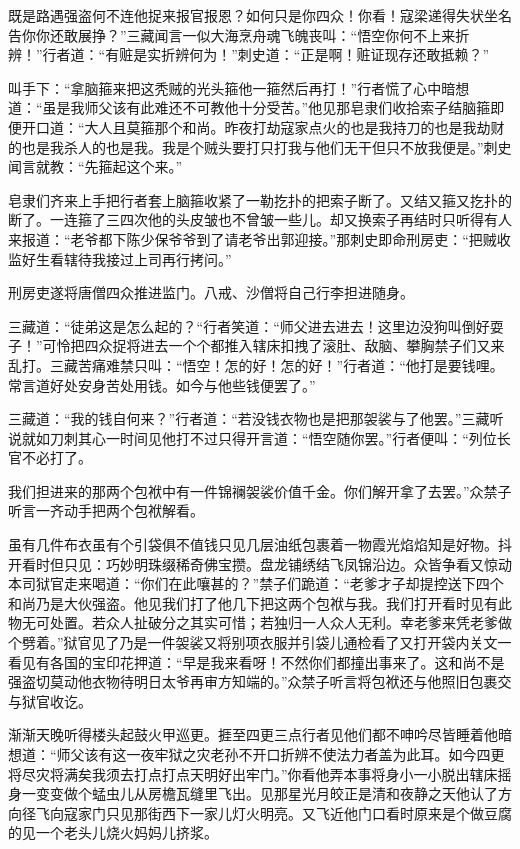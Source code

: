 \documentclass[12pt,UTF8]{ctexbook}
\begin{document}
{	既是路遇强盗何不连他捉来报官报恩？如何只是你四众！你看！寇梁递得失状坐名告你你还敢展挣？”三藏闻言一似大海烹舟魂飞魄丧叫：“悟空你何不上来折辨！”行者道：“有赃是实折辨何为！”刺史道：“正是啊！赃证现存还敢抵赖？”
	
	叫手下：“拿脑箍来把这秃贼的光头箍他一箍然后再打！”行者慌了心中暗想道：“虽是我师父该有此难还不可教他十分受苦。”他见那皂隶们收拾索子结脑箍即便开口道：“大人且莫箍那个和尚。昨夜打劫寇家点火的也是我持刀的也是我劫财的也是我杀人的也是我。我是个贼头要打只打我与他们无干但只不放我便是。”刺史闻言就教：“先箍起这个来。”
	
	皂隶们齐来上手把行者套上脑箍收紧了一勒扢扑的把索子断了。又结又箍又扢扑的断了。一连箍了三四次他的头皮皱也不曾皱一些儿。却又换索子再结时只听得有人来报道：“老爷都下陈少保爷爷到了请老爷出郭迎接。”那刺史即命刑房吏：“把贼收监好生看辖待我接过上司再行拷问。”
	
	刑房吏遂将唐僧四众推进监门。八戒、沙僧将自己行李担进随身。
	
	三藏道：“徒弟这是怎么起的？“行者笑道：“师父进去进去！这里边没狗叫倒好耍子！”可怜把四众捉将进去一个个都推入辖床扣拽了滚肚、敌脑、攀胸禁子们又来乱打。三藏苦痛难禁只叫：“悟空！怎的好！怎的好！”行者道：“他打是要钱哩。常言道好处安身苦处用钱。如今与他些钱便罢了。”
	
	三藏道：“我的钱自何来？”行者道：“若没钱衣物也是把那袈裟与了他罢。”三藏听说就如刀刺其心一时间见他打不过只得开言道：“悟空随你罢。”行者便叫：“列位长官不必打了。
	
	我们担进来的那两个包袱中有一件锦襕袈裟价值千金。你们解开拿了去罢。”众禁子听言一齐动手把两个包袱解看。
	
	虽有几件布衣虽有个引袋俱不值钱只见几层油纸包裹着一物霞光焰焰知是好物。抖开看时但只见：巧妙明珠缀稀奇佛宝攒。盘龙铺绣结飞凤锦沿边。众皆争看又惊动本司狱官走来喝道：“你们在此嚷甚的？”禁子们跪道：“老爹才子却提控送下四个和尚乃是大伙强盗。他见我们打了他几下把这两个包袱与我。我们打开看时见有此物无可处置。若众人扯破分之其实可惜；若独归一人众人无利。幸老爹来凭老爹做个劈着。”狱官见了乃是一件袈裟又将别项衣服并引袋儿通检看了又打开袋内关文一看见有各国的宝印花押道：“早是我来看呀！不然你们都撞出事来了。这和尚不是强盗切莫动他衣物待明日太爷再审方知端的。”众禁子听言将包袱还与他照旧包裹交与狱官收讫。
	
	渐渐天晚听得楼头起鼓火甲巡更。捱至四更三点行者见他们都不呻吟尽皆睡着他暗想道：“师父该有这一夜牢狱之灾老孙不开口折辨不使法力者盖为此耳。如今四更将尽灾将满矣我须去打点打点天明好出牢门。”你看他弄本事将身小一小脱出辖床摇身一变变做个蜢虫儿从房檐瓦缝里飞出。见那星光月皎正是清和夜静之天他认了方向径飞向寇家门只见那街西下一家儿灯火明亮。又飞近他门口看时原来是个做豆腐的见一个老头儿烧火妈妈儿挤浆。
	
}
\end{document}
